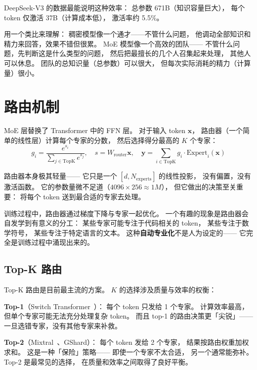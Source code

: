 DeepSeek-V3 的数据最能说明这种效率：
总参数 671B（知识容量巨大），
每个 token 仅激活 37B（计算成本低），
激活率约 5.5\%。

用一个类比来理解：
稠密模型像一个通才——不管什么问题，
他调动全部知识和精力来回答，效果不错但很累。
MoE 模型像一个高效的团队——
不管什么问题，先判断这是什么类型的问题，
然后把最擅长的几个人召集起来处理，
其他人可以休息。
团队的总知识量（总参数）可以很大，
但每次实际消耗的精力（计算量）很小。

\section{路由机制}

MoE 层替换了 Transformer 中的 FFN 层。
对于输入 token $\mathbf{x}$，
路由器（一个简单的线性层）计算每个专家的分数，
然后选择得分最高的 $K$ 个专家：
\begin{equation}
  g_i = \frac{e^{s_i}}{\sum_{j \in \mathrm{TopK}} e^{s_j}}, \quad
  s = W_{\mathrm{router}} \mathbf{x}, \quad
  \mathbf{y} = \sum_{i \in \mathrm{TopK}} g_i \cdot \mathrm{Expert}_i(\mathbf{x})
  \label{eq:moe-routing}
\end{equation}

路由器本身极其轻量——
它只是一个 $[d, N_{\mathrm{experts}}]$ 的线性投影，
没有偏置，没有激活函数。
它的参数量微不足道（$4096 \times 256 \approx 1M$），
但它做出的决策至关重要：
将每个 token 送到最合适的专家去处理。

训练过程中，路由器通过梯度下降与专家一起优化。
一个有趣的现象是路由器会自发学到有意义的分工：
某些专家可能专注于代码相关的 token，
某些专注于数学符号，
某些专注于特定语言的文本。
这种\textbf{自动专业化}不是人为设定的——
它完全是训练过程中涌现出来的。

\subsection{Top-K 路由}

Top-K 路由是目前最主流的方案。
$K$ 的选择涉及质量与效率的权衡：

\textbf{Top-1}（Switch Transformer~\cite{fedus2022switch}）：
每个 token 只发给 1 个专家。
计算效率最高，但单个专家可能无法充分处理复杂 token。
而且 top-1 的路由决策更「尖锐」——
一旦选错专家，没有其他专家来补救。

\textbf{Top-2}（Mixtral~\cite{jiang2024mixtral}、GShard）：
每个 token 发给 2 个专家，%
结果按路由权重加权求和。
这是一种「保险」策略——
即使一个专家不太合适，
另一个通常能弥补。
Top-2 是最常见的选择，
在质量和效率之间取得了良好平衡。

